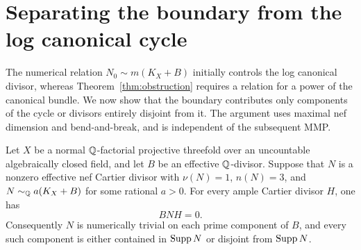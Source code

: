 \section{Separating the boundary from the log canonical cycle}
\label{sec:boundary}

The numerical relation $N_0\sim m(K_X+B)$ initially controls the log
canonical divisor, whereas Theorem~\ref{thm:obstruction} requires a
relation for a power of the canonical bundle. We now show that the
boundary contributes only components of the cycle or divisors entirely
disjoint from it. The argument uses maximal nef dimension and
bend-and-break, and is independent of the subsequent MMP.

\begin{proposition}\label{prop:separation}
Let $X$ be a normal $\mathbb Q$-factorial projective threefold over an
uncountable algebraically closed field, and let $B$ be an effective
$\mathbb Q$-divisor. Suppose that $N$ is a nonzero effective nef Cartier
divisor with $\nu(N)=1$, $n(N)=3$, and
$N\sim_{\mathbb Q}a(K_X+B)$ for some rational $a>0$. For every ample Cartier
divisor $H$, one has
\begin{equation}\label{eq:boundary-zero}
BNH=0.
\end{equation}
Consequently $N$ is numerically trivial on each prime component of $B$,
and every such component is either contained in $\operatorname{Supp} N$ or disjoint
from $\operatorname{Supp} N$.
\end{proposition}

